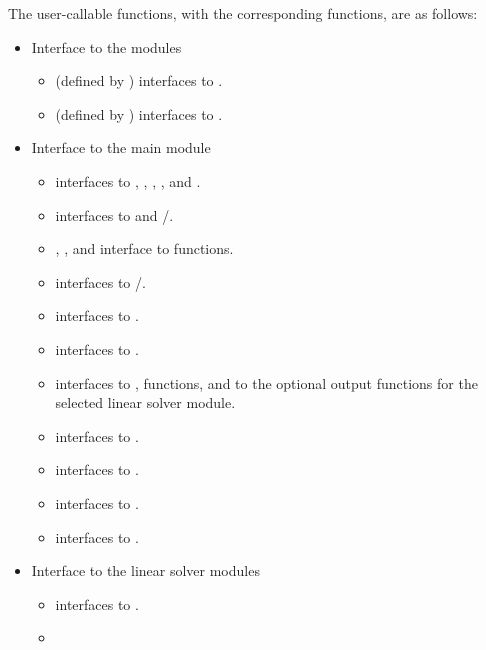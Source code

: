 The user-callable functions, with the corresponding {\ida} functions,
are as follows:
\begin{itemize}
\item
  Interface to the {\nvector} modules
  \begin{itemize}
  \item {} (defined by {\nvecs}) 
    interfaces to .
  \item {} (defined by {\nvecp}) 
    interfaces to .
  \end{itemize}
\item Interface to the main {\ida} module
  \begin{itemize}
  \item {}
    interfaces to , , ,
    , and .
  \item {}
    interfaces to  and /.
  \item {}, , and 
    interface to  functions.    
  \item {}
    interfaces to /.
  \item {}
    interfaces to .
  \item {}
    interfaces to .
  \item {}
    interfaces to ,  functions, and to the optional
    output functions for the selected linear solver module.
  \item {}
    interfaces to .
  \item {}
    interfaces to .
  \item {}
    interfaces to .
  \item {}    
    interfaces to .
  \end{itemize}
\item Interface to the linear solver modules
  \begin{itemize}
  \item {}
    interfaces to .
  \item {}

\end{itemize}
\end{itemize}
